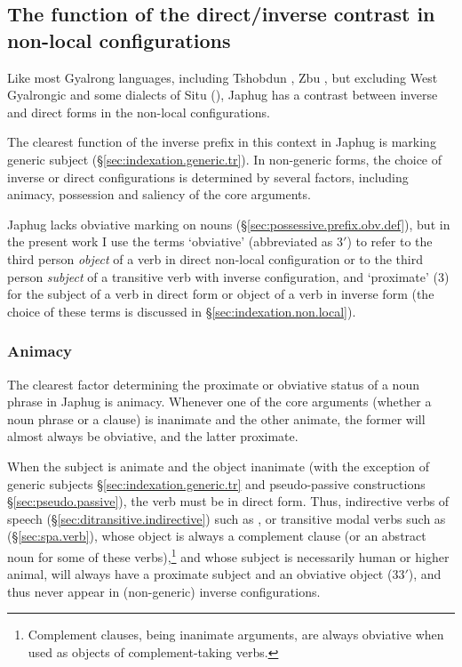 \subsection{The function of the direct/inverse contrast in non-local configurations} \label{sec:inverse.3.3.saliency}
Like most Gyalrong languages, including Tshobdun \citep{jackson02rentongdengdi}, Zbu \citep{gongxun14agreement}, but excluding West Gyalrongic \citep{lai15person} and some dialects of Situ (\citealt{jackson15sastod, zhangsy19obviative}), Japhug has a contrast between inverse and direct forms in the non-local configurations.

The clearest function of the inverse prefix in this context in Japhug is marking generic subject (§\ref{sec:indexation.generic.tr}).  In non-generic forms, the choice of inverse or direct configurations is determined by several factors, including animacy, possession and saliency of the core arguments.

Japhug lacks obviative marking on nouns (§\ref{sec:possessive.prefix.obv.def}), but in the present work I use the terms `obviative' (abbreviated as 3$'$) to refer to the third person \textit{object} of a verb in direct non-local configuration or to the third person \textit{subject} of a transitive verb with inverse configuration, and `proximate' (3) for the subject of a verb in direct form or object of a verb in inverse form (the choice of these terms is discussed in §\ref{sec:indexation.non.local}).
   
\subsubsection{Animacy}  \label{sec:obviation.animacy}
The clearest factor determining the proximate or obviative status of a noun phrase in Japhug is animacy. Whenever one of the core arguments (whether a noun phrase or a clause) is inanimate and the other animate, the former will almost always be obviative, and the latter proximate. 

When the subject is animate and the object inanimate (with the exception of generic subjects §\ref{sec:indexation.generic.tr} and pseudo-passive constructions §\ref{sec:pseudo.passive}), the verb must be in direct form. Thus, indirective verbs of speech (§\ref{sec:ditransitive.indirective}) such as , or transitive modal verbs such as  (§\ref{sec:spa.verb}), whose object is always a complement clause (or an abstract noun for some of these verbs),\footnote{Complement clauses, being inanimate arguments, are always obviative when used as objects of complement-taking verbs. } and whose subject is necessarily human or higher animal, will always have a proximate subject and an obviative object (3\fl{}3$'$), and thus never appear in (non-generic) inverse configurations. 

